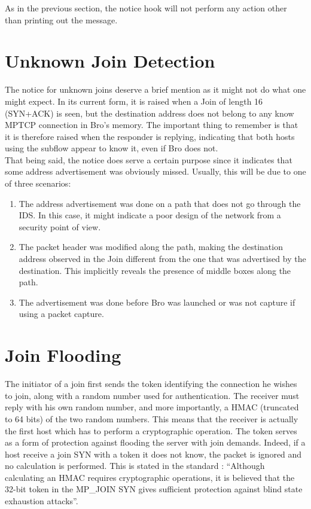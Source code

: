 As in the previous section, the notice hook will not perform any action other than printing out the message.

\section{Unknown Join Detection}
The notice for unknown joins deserve a brief mention as it might not do what one might expect. In its current form, it is raised when a Join of length 16 (SYN+ACK) is seen, but the destination address does not belong to any know MPTCP connection in Bro's memory. The important thing to remember is that it is therefore raised when the responder is replying, indicating that both hosts using the subflow appear to know it, even if Bro does not. \\

That being said, the notice does serve a certain purpose since it indicates that some address advertisement was obviously missed. Usually, this will be due to one of three scenarios: \\

\begin{enumerate}
\item The address advertisement was done on a path that does not go through the IDS. In this case, it might indicate a poor design of the network from a security point of view.
\item The packet header was modified along the path, making the destination address observed in the Join different from the one that was advertised by the destination. This implicitly reveals the presence of middle boxes along the path.
\item The advertisement was done before Bro was launched or was not capture if using a packet capture.
\end{enumerate}


\section{Join Flooding}
The initiator of a join first sends the token identifying the connection he wishes to join, along with a random number used for authentication. The receiver must reply with his own random number, and more importantly, a HMAC (truncated to 64 bits) of the two random numbers. This means that the receiver is actually the first host which has to perform a cryptographic operation. The token serves as a form of protection against flooding the server with join demands. Indeed, if a host receive a join SYN with a token it does not know, the packet is ignored and no calculation is performed. This is stated in the standard \cite{rfc6824}: ``Although calculating an HMAC requires cryptographic operations, it is believed that the 32-bit token in the MP\_JOIN SYN gives sufficient protection against blind state exhaustion attacks''.\\

